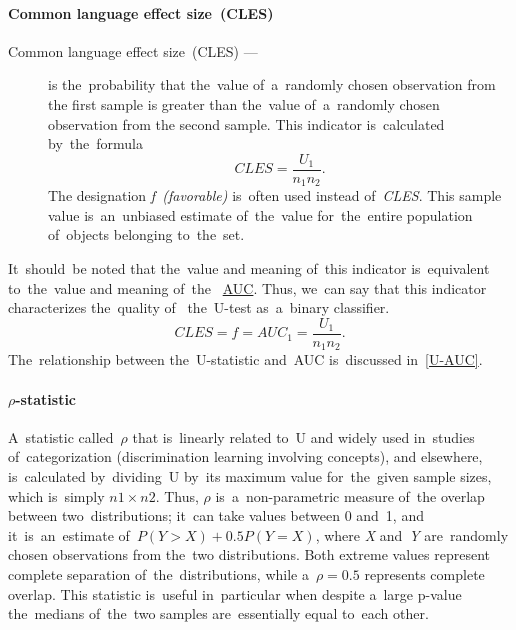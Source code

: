 \documentclass[]{scrreprt}
\begin{document}
\paragraph{Common language effect size~(CLES)}
\begin{description}
	\item[Common language effect size~(CLES) ---] is the~probability that the~value of~a~randomly chosen observation from the first sample is greater than the~value of~a~randomly chosen observation from the second sample. This indicator is~calculated by~the~formula
	\begin{equation}\label{eq:CLES}
	CLES = \frac{U_{1}}{n_{1}n_{2}}.
	\end{equation}
	The designation \emph{f~(favorable)} is~often used instead of~\emph{CLES}. This sample value is~an~unbiased estimate of~the~value for~the~entire population of~objects belonging to~the~set.	
\end{description}
It~should~be noted that the~value and meaning of~this indicator is~equivalent to~the~value and meaning of~the ~\href{https://en.wikipedia.org/wiki/Receiver_operating_characteristic}{AUC}\cite{Wiki:ROC}. Thus, we~can say that this indicator characterizes the~quality of~ the~U-test as~a~binary classifier.
\begin{equation}\label{eq:AUC}
CLES = f = AUC_{1} = \frac{U_{1}}{n_{1}n_{2}}.
\end{equation}
The~relationship between the~U-statistic and~AUC is~discussed in~\ref{U-AUC}.
%
\paragraph{$\rho$-statistic}
A~statistic called~$\rho$ that is~linearly related to~U and widely used in~studies of~categorization (discrimination learning involving concepts), and elsewhere, is~calculated by~dividing~U by~its maximum value for~the~given sample sizes, which is~simply $n1 \times n2$. Thus, $\rho$ is~a~non-parametric measure of~the overlap between two~distributions; it~can take values between 0 and~1, and it~is~an~estimate of~$P(Y > X) + 0.5 P(Y = X)$, where \textit{X} and~\textit{Y} are~randomly chosen observations from the~two distributions. Both extreme values represent complete separation of~the~distributions, while a~$ρ = 0.5$ represents complete overlap. This statistic is~useful in~particular when despite a~large p-value the~medians of~the~two samples are~essentially equal to~each other. 
%
\end{document}
